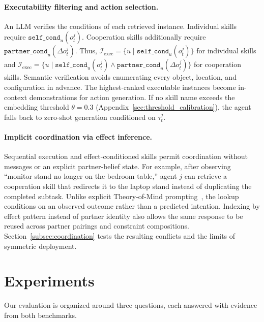 \documentclass{article}
\theoremstyle{plain}
\theoremstyle{definition}
\theoremstyle{remark}
\begin{document}
\paragraph{Executability filtering and action selection.}
An LLM verifies the conditions of each retrieved instance. Individual skills require $\texttt{self\_cond}_u(o_t^j)$. Cooperation skills additionally require $\texttt{partner\_cond}_u(\Delta o_t^j)$. Thus,
$\mathcal{I}_{\text{exec}}=\{u\mid\texttt{self\_cond}_u(o_t^j)\}$ for individual skills and
$\mathcal{I}_{\text{exec}}=\{u\mid\texttt{self\_cond}_u(o_t^j)\land\texttt{partner\_cond}_u(\Delta o_t^j)\}$ for cooperation skills. Semantic verification avoids enumerating every object, location, and configuration in advance. The highest-ranked executable instances become in-context demonstrations for action generation. If no skill name exceeds the embedding threshold $\theta=0.3$ (Appendix~\ref{sec:threshold_calibration}), the agent falls back to zero-shot generation conditioned on $\tau_t^j$.
 
\paragraph{Implicit coordination via effect inference.}
Sequential execution and effect-conditioned skills permit coordination without messages or an explicit partner-belief state. For example, after observing ``monitor stand no longer on the bedroom table,'' agent $j$ can retrieve a cooperation skill that redirects it to the laptop stand instead of duplicating the completed subtask. Unlike explicit Theory-of-Mind prompting~\citep{kosinski2023theory}, the lookup conditions on an observed outcome rather than a predicted intention. Indexing by effect pattern instead of partner identity also allows the same response to be reused across partner pairings and constraint compositions. Section~\ref{subsec:coordination} tests the resulting conflicts and the limits of symmetric deployment.
 
 
\section{Experiments}
\label{sec:experiments}
Our evaluation is organized around three questions, each answered with evidence from both benchmarks.
 
\end{document}
